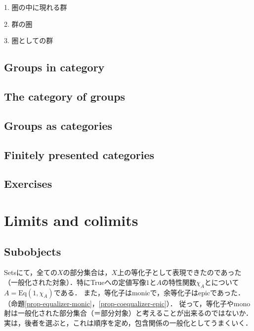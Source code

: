 \documentclass[uplatex, dvipdfmx]{jsarticle}
\begin{document}
1. 圏の中に現れる群

2. 群の圏

3. 圏としての群

\subsection{Groups in category}
\subsection{The category of groups}
\subsection{Groups as categories}
\subsection{Finitely presented categories}
\subsection{Exercises}

\section{Limits and colimits}

\subsection{Subobjects}

Setsにて，全ての$X$の部分集合は，$X$上の等化子として表現できたのであった（一般化された対象）．特にTrueへの定値写像$1$と$A$の特性関数$\chi_A$とについて$A=\mathrm{Eq}(1,\chi_A)$である．
また，等化子はmonicで，余等化子はepicであった．（命題\ref{prop-equalizer-monic}，\ref{prop-coequalizer-epic}）．
従って，等化子やmono射は一般化された部分集合（＝部分対象）と考えることが出来るのではないか．実は，後者を選ぶと，これは順序を定め，包含関係の一般化としてうまくいく．
\end{document}
